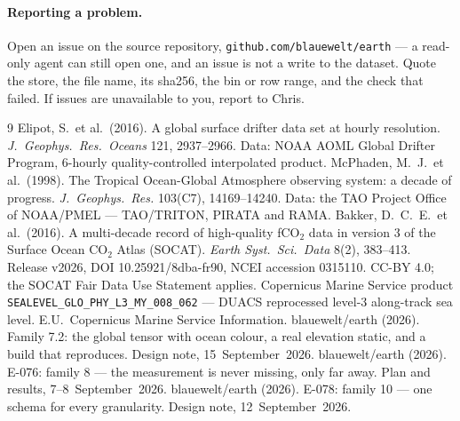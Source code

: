 \documentclass[10pt]{article}
\newcommand{\code}[1]{\texttt{#1}}
\begin{document}
\paragraph{Reporting a problem.} Open an issue on the source repository,
\code{github.com/blauewelt/earth} --- a read-only agent can still open one, and
an issue is not a write to the dataset. Quote the store, the file name, its
sha256, the bin or row range, and the check that failed. If issues are
unavailable to you, report to Chris.

\begin{thebibliography}{9}\small
{} Elipot, S.\ et al.\ (2016). A global surface drifter data set at
hourly resolution. \emph{J.\ Geophys.\ Res.\ Oceans} 121, 2937--2966. Data:
NOAA AOML Global Drifter Program, 6-hourly quality-controlled interpolated
product.
 McPhaden, M.\ J.\ et al.\ (1998). The Tropical Ocean-Global
Atmosphere observing system: a decade of progress. \emph{J.\ Geophys.\ Res.}
103(C7), 14169--14240. Data: the TAO Project Office of NOAA/PMEL ---
TAO/TRITON, PIRATA and RAMA.
 Bakker, D.\ C.\ E.\ et al.\ (2016). A multi-decade record of
high-quality fCO$_2$ data in version 3 of the Surface Ocean CO$_2$ Atlas
(SOCAT). \emph{Earth Syst.\ Sci.\ Data} 8(2), 383--413. Release v2026, DOI
10.25921/8dba-fr90, NCEI accession 0315110. CC-BY 4.0; the SOCAT Fair Data Use
Statement applies.
 Copernicus Marine Service product
\code{SEALEVEL\_GLO\_PHY\_L3\_MY\_008\_062} --- DUACS reprocessed level-3
along-track sea level. E.U.\ Copernicus Marine Service Information.
 blauewelt/earth (2026). Family 7.2: the global tensor with ocean
colour, a real elevation static, and a build that reproduces. Design note,
15~September~2026.
 blauewelt/earth (2026). E-076: family 8 --- the measurement is
never missing, only far away. Plan and results, 7--8~September~2026.
 blauewelt/earth (2026). E-078: family 10 --- one schema for
every granularity. Design note, 12~September~2026.
\end{thebibliography}
\end{document}
